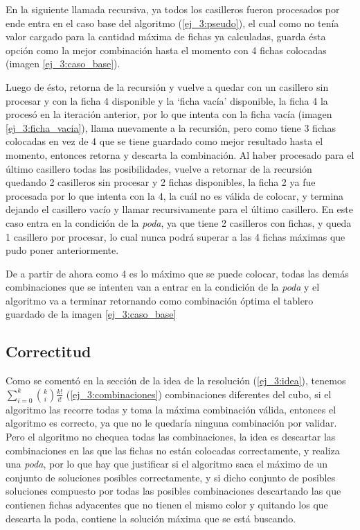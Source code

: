 En la siguiente llamada recursiva, ya todos los casilleros fueron procesados por ende entra en el caso base del algoritmo (\ref{ej_3:pseudo}), el cual como no ten\'ia valor cargado para la cantidad m\'axima de fichas ya calculadas, guarda \'esta opci\'on como la mejor combinaci\'on hasta el momento con 4 fichas colocadas (imagen \ref{ej_3:caso_base}).

Luego de \'esto, retorna de la recursi\'on y vuelve a quedar con un casillero sin procesar y con la ficha 4 disponible y la `ficha vac\'ia' disponible, la ficha 4 la proces\'o en la iteraci\'on anterior, por lo que intenta con la ficha vac\'ia (imagen \ref{ej_3:ficha_vacia}), llama nuevamente a la recursi\'on, pero como tiene 3 fichas colocadas en vez de 4 que se tiene guardado como mejor resultado hasta el momento, entonces retorna y descarta la combinaci\'on. Al haber procesado para el \'ultimo casillero todas las posibilidades, vuelve a retornar de la recursi\'on quedando 2 casilleros sin procesar y 2 fichas disponibles, la ficha 2 ya fue procesada por lo que intenta con la 4, la cu\'al no es v\'alida de colocar, y termina dejando el casillero vac\'io y llamar recursivamente para el \'ultimo casillero. En este caso entra en la condici\'on de la \emph{poda}, ya que tiene 2 casilleros con fichas, y queda 1 casillero por procesar, lo cual nunca podr\'a superar a las 4 fichas m\'aximas que pudo poner anteriormente.

De a partir de ahora como 4 es lo m\'aximo que se puede colocar, todas las dem\'as combinaciones que se intenten van a entrar en la condici\'on de la \emph{poda} y el algoritmo va a terminar retornando como combinaci\'on \'optima el tablero guardado de la imagen \ref{ej_3:caso_base}



\newpage

\subsection{Correctitud} \label{ej_3:justificacion}

Como se coment\'o en la secci\'on de la idea de la resoluci\'on (\ref{ej_3:idea}), tenemos $\sum_{i=0}^{k}\binom{k}{i}\frac{k!}{i!} \label{ej_3:k}$ (\ref{ej_3:combinaciones}) combinaciones diferentes del cubo, si el algoritmo las recorre todas y toma la m\'axima combinaci\'on v\'alida,
entonces el algoritmo es correcto, ya que no le quedar\'ia ninguna combinaci\'on por validar.
Pero el algoritmo no chequea todas las combinaciones, la idea es descartar las combinaciones en las que las fichas no est\'an colocadas correctamente, y realiza una \emph{poda}, por lo que hay que justificar si el algoritmo saca el m\'aximo de un conjunto de soluciones posibles correctamente, y si dicho conjunto de posibles soluciones compuesto por todas las posibles combinaciones descartando las que contienen fichas adyacentes que no tienen el mismo color y quitando los que descarta la poda, contiene la soluci\'on m\'axima que se est\'a buscando.

